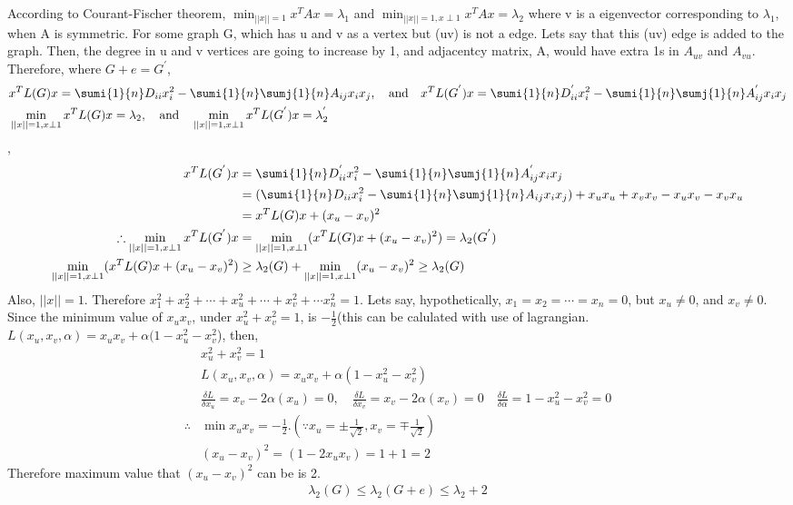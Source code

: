 \documentclass{article}
\begin{document}
\begin{problem}
    According to Courant-Fischer theorem, $\min_{||x|| = 1} x^T A x = \lambda_1$ and $\min_{||x|| = 1, x\perp 1} x^T A x = \lambda_2$ where v is a eigenvector corresponding to $\lambda_1$, when A is symmetric. For some graph G, which has u and v as a vertex but (uv) is not a edge. Lets say that this (uv) edge is added to the graph. Then, the degree in u and v vertices are going to increase by 1, and adjacentcy matrix, A, would have extra 1s in $A_{uv}$ and $A_{vu}$. Therefore, where $G + e = G^{'}$, 
    \begin{align*}
        &x^T L(G) x = \sumi{1}{n} D_{ii} x_i^2 - \sumi{1}{n} \sumj{1}{n} A_{ij}x_i x_j 
        , \quad \textrm{and} \quad \space x^T L(G^{'}) x = \sumi{1}{n} D^{'}_{ii} x_i^2 - \sumi{1}{n} \sumj{1}{n} A^{'}_{ij}x_i x_j \\
        &\min_{||x|| = 1, x\perp 1} x^T L(G) x = \lambda_2,\quad \textrm{and} \quad \min_{||x|| = 1, x\perp 1} x^T L(G^{'}) x = \lambda_2^{'}
    \end{align*},
    \begin{align*}
        x^T L(G^{'}) x &= \sumi{1}{n} D^{'}_{ii} x_i^2 - \sumi{1}{n} \sumj{1}{n} A^{'}_{ij}x_i x_j \\
        &=(\sumi{1}{n} D_{ii} x_i^2 - \sumi{1}{n} \sumj{1}{n} A_{ij}x_i x_j) + x_u x_u + x_v x_v - x_u x_v - x_v x_u\\
        &=   x^T L(G) x + (x_u - x_v)^2\\
        \therefore  \min_{||x|| = 1, x\perp 1} x^T L(G^{'}) x &=  \min_{||x|| = 1, x\perp 1} (x^T L(G) x  + (x_u - x_v)^2) = \lambda_2(G^{'})  \\
        \min_{||x|| = 1, x\perp 1} (x^T L(G) x  + (x_u - x_v)^2) &\geq \lambda_2(G) + \min_{||x|| = 1, x\perp 1} (x_u - x_v)^2   \geq \lambda_2(G)
    \end{align*}
    Also, $||x|| = 1$. Therefore $x_1^2 + x_2^2 + \cdots +  x_u ^2 + \cdots +  x_v^2 + \cdots x_n^2 = 1 $. Lets say, hypothetically, $ x_1 = x_2 = \cdots = x_n = 0$, but $x_u \neq 0$, and $x_v \neq 0$. Since the minimum value of $x_u x_v$, under $x_u^2 + x_v^2 = 1$, is $-\frac{1}{2}$(this can be calulated with use of lagrangian. $L(x_u, x_v, \alpha) = x_u x_v + \alpha (1 - x_u^2 - x_v^2$), then, 
    \begin{align*}
        &x_u^2 + x_v^2 = 1\\
        &L(x_u, x_v, \alpha) = x_u x_v + \alpha (1 - x_u^2 - x_v^2)\\
        &\frac{\delta L}{\delta x_u} = x_v - 2 \alpha (x_u) = 0, \quad
        \frac{\delta L}{\delta x_v} = x_v - 2 \alpha (x_v) = 0 \quad
        \frac{\delta L}{\delta \alpha} = 1 - x_u^2 - x_v^2 = 0\\
        \therefore & \min{x_u x_v}  = -\frac{1}{2}. (\because x_u = \pm \frac{1}{\sqrt{2}}, x_v = \mp \frac{1}{\sqrt{2}})\\
        &(x_u - x_v)^2  = (1 - 2 x_u x_v) = 1 + 1 = 2 
    \end{align*}
    Therefore maximum value that $(x_u - x_v)^2$ can be is 2. 
    \begin{align*}
        \lambda_2 (G) \leq \lambda_2(G+e) \leq \lambda_2 + 2
    \end{align*}
\end{problem}
\end{document}
